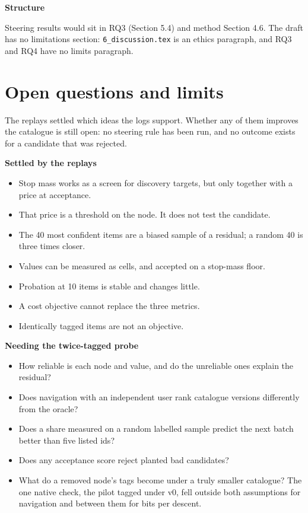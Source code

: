 \documentclass[10pt,a4paper]{article}
\newcommand{\code}[1]{\texttt{#1}}
\newcommand{\lab}[1]{\par\vspace{0.35em}\textbf{#1}\par\nobreak}
\begin{document}
\lab{Structure}
Steering results would sit in RQ3 (Section 5.4) and method Section 4.6. The draft has no limitations section:
\code{6\_discussion.tex} is an ethics paragraph, and RQ3 and RQ4 have no limits paragraph.

\section{Open questions and limits}

The replays settled which ideas the logs support. Whether any of them improves the catalogue is still open:
no steering rule has been run, and no outcome exists for a candidate that was rejected.

\lab{Settled by the replays}
\begin{itemize}
\item Stop mass works as a screen for discovery targets, but only together with a price at acceptance.
\item That price is a threshold on the node. It does not test the candidate.
\item The 40 most confident items are a biased sample of a residual; a random 40 is three times closer.
\item Values can be measured as cells, and accepted on a stop-mass floor.
\item Probation at 10 items is stable and changes little.
\item A cost objective cannot replace the three metrics.
\item Identically tagged items are not an objective.
\end{itemize}

\lab{Needing the twice-tagged probe}
\begin{itemize}
\item How reliable is each node and value, and do the unreliable ones explain the residual?
\item Does navigation with an independent user rank catalogue versions differently from the oracle?
\item Does a share measured on a random labelled sample predict the next batch better than five listed ids?
\item Does any acceptance score reject planted bad candidates?
\item What do a removed node's tags become under a truly smaller catalogue? The one native check, the pilot tagged under v0, fell outside both assumptions for navigation and between them for bits per descent.
\end{itemize}
\end{document}
